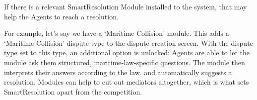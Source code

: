 If there is a relevant SmartResolution Module installed to the system, that may help the Agents to reach a resolution.

For example, let's say we have a `Maritime Collision' module. This adds a `Maritime Collision' dispute type to the dispute-creation screen. With the dispute type set to this type, an additional option is unlocked: Agents are able to let the module ask them structured, maritime-law-specific questions. The module then interprets their answers according to the law, and automatically suggests a resolution. Modules can help to cut out mediators altogether, which is what sets SmartResolution apart from the competition.